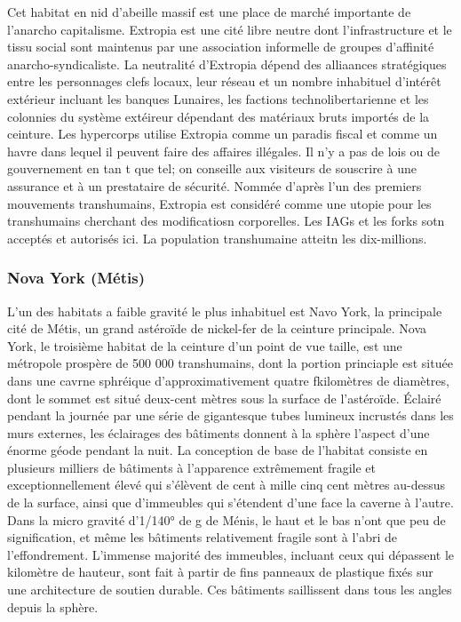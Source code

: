                                                                Cet habitat en nid d'abeille massif est une place de marché importante de l'anarcho capitalisme. Extropia est une cité libre neutre dont l'infrastructure et le tissu social sont maintenus par une association informelle de groupes d'affinité anarcho-syndicaliste. La neutralité d'Extropia dépend des alliaances stratégiques entre les personnages clefs locaux, leur réseau et un nombre inhabituel d'intérêt extérieur incluant les banques Lunaires, les factions technolibertarienne et les colonnies du système extéireur dépendant des matériaux bruts importés de la ceinture. Les hypercorps utilise Extropia comme un paradis fiscal et comme un havre dans lequel il peuvent faire des affaires illégales. Il n'y a pas de lois ou de gouvernement en tan t que tel; on conseille aux visiteurs de souscrire à une assurance et à un prestataire de sécurité. Nommée d'après l'un des premiers mouvements transhumains, Extropia est considéré comme une utopie pour les transhumains cherchant des modificatiosn corporelles. Les IAGs et les forks sotn acceptés et autorisés ici. La population transhumaine atteitn les dix-millions. 

                                                               \subsubsection{Nova York (Métis)} \label{sec:nova-york-metis} 

                                                               L'un des habitats a faible gravité le plus inhabituel est Navo York, la principale cité de Métis, un grand astéroïde de nickel-fer de la ceinture principale. Nova York, le troisième habitat de la ceinture d'un point de vue taille, est une métropole prospère de 500 000 transhumains, dont la portion princiaple est située dans une cavrne sphréique d'approximativement quatre fkilomètres de diamètres, dont le  sommet est situé deux-cent mètres sous la surface de l'astéroïde. Éclairé pendant la journée par une série de gigantesque tubes lumineux incrustés dans les murs externes, les éclairages des bâtiments donnent à la sphère l'aspect d'une énorme géode pendant la nuit. La conception de base de l'habitat consiste en plusieurs milliers de bâtiments à l'apparence extrêmement fragile et exceptionnellement élevé qui s'élèvent de cent à mille cinq cent mètres au-dessus de la surface, ainsi que d'immeubles qui s'étendent d'une face la caverne à l'autre. Dans la micro gravité d'1/140° de g de Ménis, le haut et le bas n'ont que peu de signification, et même les bâtiments relativement fragile sont à l'abri de l'effondrement. L'immense majorité des immeubles, incluant ceux qui dépassent le kilomètre de hauteur, sont fait à partir de fins panneaux de plastique fixés sur une architecture de soutien durable. Ces bâtiments saillissent dans tous les angles depuis la sphère. 

